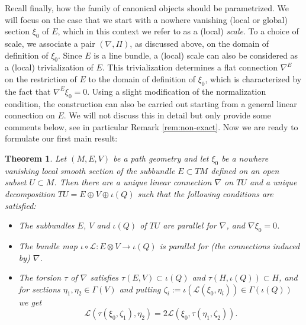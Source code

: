 \documentclass[11pt]{amsart}
\newtheorem{theorem}[proposition]{Theorem}
\numberwithin{proposition}{section}
\numberwithin{equation}{section}
\begin{document}
Recall finally, how the family of canonical objects should be parametrized. We will focus on the case that we start with a nowhere vanishing (local or global) section $\xi_0$ of $E$, which in this context we refer to as a (local) \textit{scale}. To a choice of scale, we associate a pair $(\nabla,\Pi)$, as discussed above, on the domain of definition of $\xi_0$. Since $E$ is a line bundle, a (local) scale can also be considered as a (local) trivialization of $E$. This trivialization determines a flat connection $\nabla^E$ on the restriction of $E$ to the domain of definition of $\xi_0$, which is characterized by the fact that $\nabla^E\xi_0=0$. Using a slight modification of the normalization condition, the construction can also be carried out starting from a general linear connection on $E$. We will not discuss this in detail but only provide some comments below, see in particular Remark \ref{rem:non-exact}. Now we are ready to formulate our first main result:

\begin{theorem}\label{thm:main}
    Let $(M,E,V)$ be a path geometry and let $\xi_0$ be a nowhere vanishing local smooth section of the subbundle $E\subset TM$ defined on an open subset $U\subset M$. Then there are a unique linear connection $\nabla$ on $TU$ and a unique decomposition $TU=E\oplus V\oplus \iota(Q)$ such that the following conditions are satisfied: 
    \begin{itemize}
        \item[(i)] The subbundles $E$, $V$ and $\iota(Q)$ of $TU$ are parallel for $\nabla$, and $\nabla\xi_0=0$. 
        \item[(ii)] The bundle map $\iota\circ\mathcal L:E\otimes V\to\iota(Q)$ is parallel for (the connections induced by) $\nabla$.
        \item[(iii)] The torsion $\tau$ of $\nabla$ satisfies $\tau(E,V)\subset \iota(Q)$ and $\tau(H,\iota(Q))\subset H$, and for sections $\eta_1,\eta_2\in\Gamma(V)$ and putting $\zeta_i:=\iota(\mathcal L(\xi_0,\eta_i))\in\Gamma(\iota(Q))$ we get 
        \begin{equation}\label{eq:norm}
            \mathcal L(\tau(\xi_0,\zeta_1),\eta_2)=2\mathcal L(\xi_0,\tau(\eta_1,\zeta_2)).
        \end{equation}
    \end{itemize}
\end{theorem}
\end{document}
